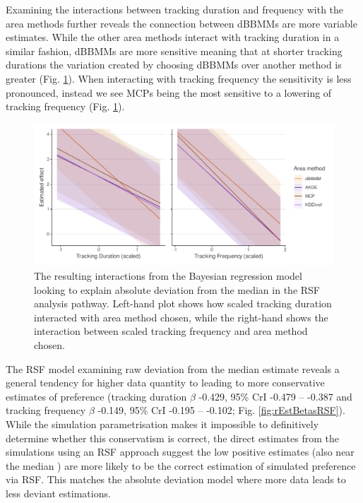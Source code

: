 \documentclass[10pt,a4paper]{article}
\begin{document}
Examining the interactions between tracking duration and frequency with the area methods further reveals the connection between dBBMMs are more variable estimates.
While the other area methods interact with tracking duration in a similar fashion, dBBMMs are more sensitive meaning that at shorter tracking durations the variation created by choosing dBBMMs over another method is greater (Fig. \ref{fig:rsfInteractions}).
When interacting with tracking frequency the sensitivity is less pronounced, instead we see MCPs being the most sensitive to a lowering of tracking frequency (Fig. \ref{fig:rsfInteractions}).

\begin{figure}
\includegraphics[width=1\linewidth]{../figures/rsfEffectPlot_iteractions} \caption{The resulting interactions from the Bayesian regression model looking to explain absolute deviation from the median in the RSF analysis pathway. Left-hand plot shows how scaled tracking duration interacted with area method chosen, while the right-hand shows the interaction between scaled tracking frequency and area method chosen.}\label{fig:rsfInteractions}
\end{figure}

The RSF model examining raw deviation from the median estimate reveals a general tendency for higher data quantity to leading to more conservative estimates of preference (tracking duration \(\beta\) -0.429, 95\% CrI -0.479 -- -0.387 and tracking frequency \(\beta\) -0.149, 95\% CrI -0.195 -- -0.102; Fig. \ref{fig:rEstBetasRSF}).
While the simulation parametrisation makes it impossible to definitively determine whether this conservatism is correct, the direct estimates from the simulations using an RSF approach suggest the low positive estimates (also near the median ) are more likely to be the correct estimation of simulated preference via RSF.
This matches the absolute deviation model where more data leads to less deviant estimations.
\end{document}
